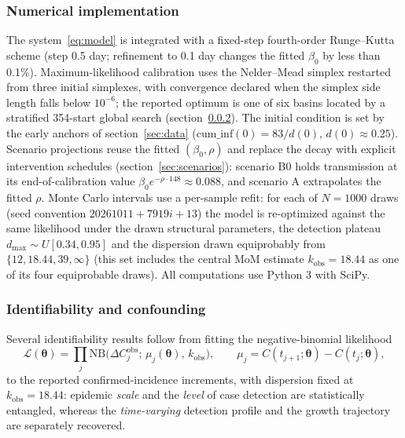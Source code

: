 \documentclass[10pt]{plos}
\begin{document}
\subsubsection{Numerical implementation}\label{sec:numerics}

The system~\eqref{eq:model} is integrated with a fixed-step fourth-order
Runge--Kutta scheme (step 0.5 day; refinement to 0.1 day changes the
fitted $\beta_0$ by less than 0.1\%). Maximum-likelihood calibration uses
the Nelder--Mead simplex restarted from three initial simplexes, with
convergence declared when the simplex side length falls below $10^{-6}$;
the reported optimum is one of six basins located by a stratified
354-start global search (section~\ref{sec:ident}).
The initial condition is set by the early anchors of section~\ref{sec:data}
($\mathrm{cum\_inf}(0)=83/d(0)$, $d(0)\approx0.25$). Scenario projections
reuse the fitted $(\beta_0,\rho)$ and replace the decay with explicit
intervention schedules (section~\ref{sec:scenarios}): scenario B0 holds
transmission at its end-of-calibration value $\beta_0e^{-\rho\cdot148}\approx0.088$,
and scenario A extrapolates the fitted $\rho$. Monte Carlo intervals use
a per-sample refit: for each of $N=1000$ draws (seed convention
$20261011+7919i+13$) the model is re-optimized against the same
likelihood under the drawn structural parameters, the detection plateau
$d_{\max}\sim U[0.34,0.95]$ and the dispersion drawn equiprobably from
$\{12,18.44,39,\infty\}$ (this set includes the central MoM estimate
$k_{\mathrm{obs}}=18.44$ as one of its four equiprobable draws). All computations use
Python 3 with SciPy.
\subsubsection{Identifiability and confounding}\label{sec:ident}

Several identifiability results follow from fitting the negative-binomial
likelihood
\begin{equation}
\mathcal{L}(\boldsymbol{\theta})
= \prod_{j}\mathrm{NB}\!\big(\Delta C^{\mathrm{obs}}_{j};\,
\mu_{j}(\boldsymbol{\theta}),\,k_{\mathrm{obs}}\big),
\qquad
\mu_{j}=C(t_{j+1};\boldsymbol{\theta})-C(t_{j};\boldsymbol{\theta}),
\label{eq:ident-lik}
\end{equation}
to the reported confirmed-incidence increments, with dispersion fixed at
$k_{\mathrm{obs}}=18.44$: epidemic \emph{scale} and the \emph{level} of case
detection are statistically entangled, whereas the \emph{time-varying}
detection profile and the growth trajectory are separately recovered.
\end{document}
